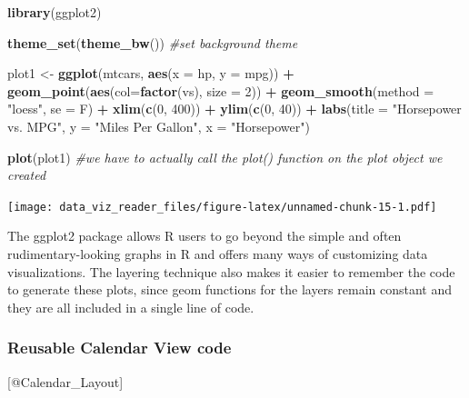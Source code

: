 \documentclass[]{book}
\newenvironment{Shaded}{\begin{snugshade}}{\end{snugshade}}
\newcommand{\KeywordTok}[1]{\textcolor[rgb]{0.13,0.29,0.53}{\textbf{#1}}}
\newcommand{\DataTypeTok}[1]{\textcolor[rgb]{0.13,0.29,0.53}{#1}}
\newcommand{\DecValTok}[1]{\textcolor[rgb]{0.00,0.00,0.81}{#1}}
\newcommand{\StringTok}[1]{\textcolor[rgb]{0.31,0.60,0.02}{#1}}
\newcommand{\CommentTok}[1]{\textcolor[rgb]{0.56,0.35,0.01}{\textit{#1}}}
\newcommand{\OperatorTok}[1]{\textcolor[rgb]{0.81,0.36,0.00}{\textbf{#1}}}
\newcommand{\NormalTok}[1]{#1}
\theoremstyle{definition}
\theoremstyle{definition}
\theoremstyle{definition}
\theoremstyle{remark}
\begin{document}
\begin{Shaded}
\begin{Highlighting}[]
\KeywordTok{library}\NormalTok{(ggplot2)}

\KeywordTok{theme_set}\NormalTok{(}\KeywordTok{theme_bw}\NormalTok{())  }\CommentTok{#set background theme}

\NormalTok{plot1 <-}\StringTok{ }\KeywordTok{ggplot}\NormalTok{(mtcars, }\KeywordTok{aes}\NormalTok{(}\DataTypeTok{x =}\NormalTok{ hp, }\DataTypeTok{y =}\NormalTok{ mpg)) }\OperatorTok{+}\StringTok{ }\KeywordTok{geom_point}\NormalTok{(}\KeywordTok{aes}\NormalTok{(}\DataTypeTok{col=}\KeywordTok{factor}\NormalTok{(vs), }\DataTypeTok{size =} \DecValTok{2}\NormalTok{)) }\OperatorTok{+}\StringTok{ }\KeywordTok{geom_smooth}\NormalTok{(}\DataTypeTok{method =} \StringTok{"loess"}\NormalTok{, }\DataTypeTok{se =}\NormalTok{ F) }\OperatorTok{+}\StringTok{ }\KeywordTok{xlim}\NormalTok{(}\KeywordTok{c}\NormalTok{(}\DecValTok{0}\NormalTok{, }\DecValTok{400}\NormalTok{)) }\OperatorTok{+}\StringTok{ }\KeywordTok{ylim}\NormalTok{(}\KeywordTok{c}\NormalTok{(}\DecValTok{0}\NormalTok{, }\DecValTok{40}\NormalTok{)) }\OperatorTok{+}\StringTok{ }\KeywordTok{labs}\NormalTok{(}\DataTypeTok{title =} \StringTok{"Horsepower vs. MPG"}\NormalTok{, }\DataTypeTok{y =} \StringTok{"Miles Per Gallon"}\NormalTok{, }\DataTypeTok{x =} \StringTok{"Horsepower"}\NormalTok{)}

\KeywordTok{plot}\NormalTok{(plot1)  }\CommentTok{#we have to actually call the plot() function on the plot object we created}
\end{Highlighting}
\end{Shaded}

\texttt{[image: data\_viz\_reader\_files/figure-latex/unnamed-chunk-15-1.pdf]}

The ggplot2 package allows R users to go beyond the simple and often
rudimentary-looking graphs in R and offers many ways of customizing data
visualizations. The layering technique also makes it easier to remember
the code to generate these plots, since geom functions for the layers
remain constant and they are all included in a single line of code.

\subsubsection{Reusable Calendar View
code}\label{reusable-calendar-view-code}

{[}@Calendar\_Layout{]}
\end{document}
